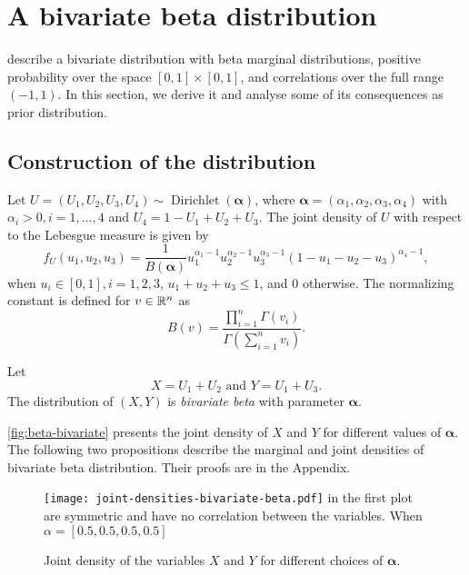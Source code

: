 \chapter{A bivariate beta distribution}
\label{appendix:bivariate-beta-distribution}

\textcite{olkin2015constructions} describe a bivariate distribution with beta
marginal distributions, positive probability over the space $[0,1] \times
[0,1]$, and correlations over the full range $(-1,1)$. In this section, we
derive it and analyse some of its consequences as prior distribution. 

\section{Construction of the distribution}

Let $U = (U_1, U_2, U_3, U_4) \sim
\operatorname{Dirichlet}(\boldsymbol{\alpha})$, where $\boldsymbol{\alpha} =
(\alpha_1, \alpha_2, \alpha_3, \alpha_4)$ with $\alpha_i > 0, i = 1,\dots,4$
and $U_4 = 1 - U_1 + U_2 + U_3$. The joint density of $U$ with respect to the
Lebesgue measure is given by
\begin{equation}
  f_U(u_1, u_2, u_3) = \frac{1}{B(\boldsymbol{\alpha})}u_1^{\alpha_1-1}u_2^{\alpha_2-1}u_3^{\alpha_3-1}(1-u_1-u_2-u_3)^{\alpha_4-1}, 
\end{equation}
when $u_i \in [0,1], i = 1,2,3$, $u_1 + u_2 + u_3 \le 1$, and $0$ otherwise.
The normalizing constant is defined for $v \in \mathbb{R}^n$ as
$$B(v) = \frac{\prod_{i=1}^n \Gamma(v_i)}{\Gamma\left(\sum_{i=1}^n v_i\right)}.$$ 
\begin{definition}
  Let 
  \begin{equation}
    X = U_1 + U_2 \text{ and } Y = U_1 + U_3.
  \end{equation} 
    The distribution of $(X,Y)$ is {\em bivariate beta} with parameter
    $\boldsymbol{\alpha}$. 
\end{definition}

\autoref{fig:beta-bivariate} presents the joint density of $X$ and $Y$ for
different values of $\boldsymbol{\alpha}$. The following two propositions describe the marginal and joint
densities of
bivariate beta distribution. Their proofs are in the Appendix. 

\begin{figure}[!ht]
  \centering
  \caption{Joint density of the variables $X$ and $Y$ for different choices of $\boldsymbol{\alpha}$.}
  \texttt{[image: joint-densities-bivariate-beta.pdf]}
   in the first plot are
  symmetric and have no correlation between the variables. When $\alpha =
  [0.5, 0.5, 0.5, 0.5]$
  \label{fig:beta-bivariate}
\end{figure}

